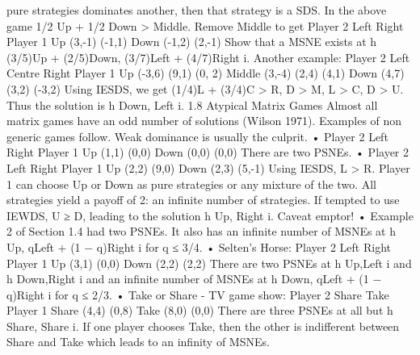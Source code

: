 pure strategies dominates another, then that strategy is a SDS.
In the above game 1/2 Up + 1/2 Down > Middle. Remove Middle to get
Player 2
Left Right
Player 1 Up (3,-1) (-1,1)
Down (-1,2) (2,-1)
Show that a MSNE exists at h (3/5)Up + (2/5)Down, (3/7)Left + (4/7)Right i.
Another example:
Player 2
Left Centre Right
Player 1
Up (-3,6) (9,1) (0, 2)
Middle (3,-4) (2,4) (4,1)
Down (4,7) (3,2) (-3,2)
Using IESDS, we get (1/4)L + (3/4)C > R, D > M, L > C, D > U. Thus the solution is
h Down, Left i.
1.8 Atypical Matrix Games
Almost all matrix games have an odd number of solutions (Wilson 1971). Examples of
non generic games follow. Weak dominance is usually the culprit.
•
Player 2
Left Right
Player 1 Up (1,1) (0,0)
Down (0,0) (0,0)
There are two PSNEs.
•
Player 2
Left Right
Player 1 Up (2,2) (9,0)
Down (2,3) (5,-1)
Using IESDS, L > R. Player 1 can choose Up or Down as pure strategies or any
mixture of the two. All strategies yield a payoff of 2: an infinite number of strategies.
If tempted to use IEWDS, U ≥ D, leading to the solution h Up, Right i. Caveat
emptor!
• Example 2 of Section 1.4 had two PSNEs. It also has an infinite number of MSNEs
at h Up, qLeft + (1 − q)Right i for q ≤ 3/4.
• Selten’s Horse:
Player 2
Left Right
Player 1 Up (3,1) (0,0)
Down (2,2) (2,2)
There are two PSNEs at h Up,Left i and h Down,Right i and an infinite number of
MSNEs at h Down, qLeft + (1 − q)Right i for q ≤ 2/3.
• Take or Share - TV game show:
Player 2
Share Take
Player 1 Share (4,4) (0,8)
Take (8,0) (0,0)
There are three PSNEs at all but h Share, Share i. If one player chooses Take, then
the other is indifferent between Share and Take which leads to an infinity of MSNEs.
